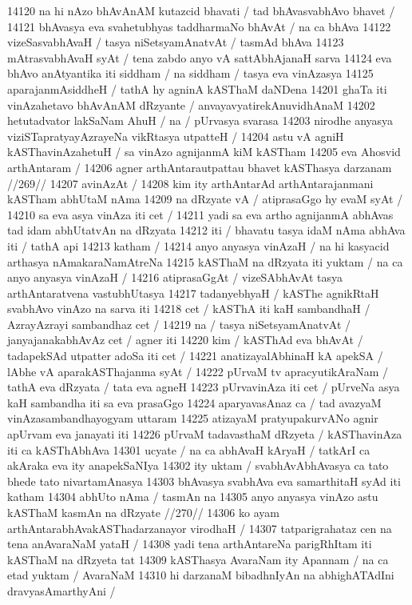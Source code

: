 14120 na hi nAzo bhAvAnAM kutazcid bhavati / tad bhAvasvabhAvo bhavet /  
14121 bhAvasya eva svahetubhyas taddharmaNo bhAvAt / na ca bhAva
14122 vizeSasvabhAvaH / tasya niSetsyamAnatvAt / tasmAd bhAva
14123 mAtrasvabhAvaH syAt / tena zabdo anyo vA sattAbhAjanaH sarva
14124 eva bhAvo anAtyantika iti siddham / na siddham / tasya eva vinAzasya
14125 aparajanmAsiddheH / tathA hy agninA kASThaM daNDena  
14201 ghaTa iti vinAzahetavo bhAvAnAM dRzyante / anvayavyatirekAnuvidhAnaM
14202 hetutadvator lakSaNam AhuH / na / pUrvasya svarasa 
14203 nirodhe anyasya viziSTapratyayAzrayeNa vikRtasya utpatteH /  
14204 astu vA agniH kASThavinAzahetuH / sa vinAzo agnijanmA kiM kASTham
14205 eva Ahosvid arthAntaram / 
14206 	agner arthAntarautpattau bhavet kASThasya darzanam //269// 
14207 	avinAzAt /  
14208 kim ity arthAntarAd arthAntarajanmani kASTham abhUtaM nAma 
14209 na dRzyate vA / atiprasaGgo hy evaM syAt /
14210 	sa eva asya vinAza iti cet /
14211 yadi sa eva artho agnijanmA abhAvas tad idam abhUtatvAn na  dRzyata  
14212 iti / bhavatu tasya idaM nAma abhAva iti / tathA api 
14213 	katham / 
14214 anyo anyasya vinAzaH / na hi kasyacid arthasya nAmakaraNamAtreNa  
14215 kASThaM na dRzyata iti yuktam / na ca anyo anyasya vinAzaH /
14216 atiprasaGgAt / vizeSAbhAvAt tasya arthAntaratvena vastubhUtasya
14217 tadanyebhyaH / kASThe agnikRtaH svabhAvo vinAzo na sarva iti
14218 cet / kASThA iti kaH sambandhaH / AzrayAzrayi sambandhaz cet /  
14219 na / tasya niSetsyamAnatvAt / janyajanakabhAvAz cet / agner iti 
14220 kim / kASThAd eva bhAvAt / tadapekSAd utpatter adoSa iti cet /
14221 anatizayalAbhinaH kA apekSA / lAbhe vA aparakASThajanma syAt /  
14222 pUrvaM tv apracyutikAraNam / tathA eva dRzyata / tata eva agneH 
14223 pUrvavinAza iti cet / pUrveNa asya kaH sambandha iti sa eva prasaGgo  
14224 aparyavasAnaz ca / tad avazyaM vinAzasambandhayogyam uttaram 
14225 atizayaM pratyupakurvANo agnir apUrvam eva janayati iti  
14226 pUrvaM tadavasthaM dRzyeta / kASThavinAza iti ca kASThAbhAva  
14301 ucyate / na ca abhAvaH kAryaH / tatkArI ca akAraka eva ity anapekSaNIya
14302 ity uktam / svabhAvAbhAvasya ca tato bhede tato nivartamAnasya 
14303 bhAvasya svabhAva eva samarthitaH syAd iti katham 
14304 abhUto nAma / tasmAn na
14305 	anyo anyasya vinAzo astu kASThaM kasmAn na dRzyate //270//  
14306 ko ayam arthAntarabhAvakASThadarzanayor virodhaH /  
14307 	tatparigrahataz cen na tena anAvaraNaM yataH /
14308 yadi tena arthAntareNa parigRhItam iti kASThaM na dRzyeta tat
14309 kASThasya AvaraNam ity Apannam / na ca etad yuktam / AvaraNaM
14310 hi darzanaM bibadhnIyAn na abhighATAdIni dravyasAmarthyAni / 
